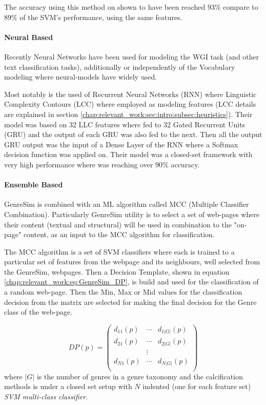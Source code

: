 The accuracy using this method on shown to have been reached $93\%$ compare to $89\%$ of the SVM's performance, using the same features.


\paragraph{Neural Based} Recently Neural Networks have been used for modeling the WGI task (and other text classification tasks), additionally or independently of the Vocabulary modeling where neural-models have widely used. 

Most notably is the used of Recurrent Neural Networks (RNN) where Linguistic Complexity Contours (LCC) where employed as modeling features (LCC details are explained in section \ref{chap:relevant_work:sec:intro:subsec:heuristics}). Their model was based on 32 LLC features where fed to 32 Gated Recurrent Units (GRU)  and the output of each GRU was also fed to the next. Then all the output GRU output was the input of a Dense Layer of the RNN where a Softmax decision function was applied on. Their model was a closed-set framework with very high performance where was reaching over $90\%$  accuracy\parencite{strobel2018text}.

\paragraph{Ensemble Based} 

GenreSim is combined with an ML algorithm called MCC (Multiple Classifier Combination). Particularly GenreSim utility is to select a set of web-pages where their content (textual and structural) will be used in combination to the "on-page" content, as an input to the MCC algorithm for classification.

The MCC algorithm is a set of SVM classifiers where each is trained to a particular set of features from the webpage and its neighbours, well selected from the GenreSim, webpages. Then a Decision Template, shown in equation \ref{chap:relevant_work:eq:GenreSim_DP}, is build and used for the classification of a random web-page. Then the Min, Max or Mid values for the classification decision from the matrix are selected for making the final decision for the Genre class of the web-page.

\begin{equation}\label{chap:relevant_work:eq:GenreSim_DP}
	DP(p) = \left(
    	\begin{array}{ccc}
        	d_{11} (p) & \cdots & d_{1|G|} (p) \\
            d_{21} (p) & \cdots  & d_{2|G|} (p) \\
            & \vdots & \\
            d_{N1} (p) & \cdots  & d_{N|G|} (p) \\
         \end{array}
\right)
\end{equation}
\noindent
where $|G|$ is the number of genres in a genre taxonomy and the calcification methods is under a closed set setup with $N$ indented (one for each feature set) \textit{SVM multi-class classifier}. 




